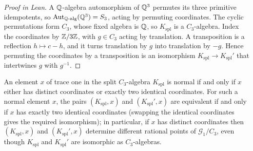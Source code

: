 \begin{proof}[Proof in Lean]

\leanok

A $\mathbb{Q}$-algebra automorphism of $\mathbb{Q}^3$ permutes its three primitive idempotents, so $\mathrm{Aut}_{\mathbb{Q}\text{-alg}}(\mathbb{Q}^3)=S_3$, acting by permuting coordinates. The cyclic permutations form $C_3$, whose fixed algebra is $\mathbb{Q}$, so $K_{\text{spl}}$ is a $C_3$-algebra. Index the coordinates by $\mathbb{Z}/3\mathbb{Z}$, with $g\in C_3$ acting by translation. A transposition is a reflection $h\mapsto c-h$, and it turns translation by $g$ into translation by $-g$. Hence permuting the coordinates by a transposition is an isomorphism $K_{\text{spl}}\to K_{\text{spl}}'$ that intertwines $g$ with $g^{-1}$.

\end{proof}

\begin{example}

\label{example:splitAlgebraNormalElement}


\leanok



 An element $x$ of trace one in the split $C_3$-algebra $K_{\text{spl}}$ is normal if and only if $x$ either has distinct coordinates or exactly two identical coordinates. For such a normal element $x$, the pairs $(K_{\text{spl}},x)$ and $(K_{\text{spl}}',x)$ are equivalent if and only if $x$ has exactly two identical coordinates (swapping the identical coordinates gives the required isomorphism); in particular, if $x$ has distinct coordinates then $(K_{\text{spl}},x)$ and $(K_{\text{spl}}',x)$ determine different rational points of $\mathcal G_1/C_3$, even though $K_{\text{spl}}$ and $K_{\text{spl}}'$ are isomorphic as $C_3$-algebras. 

\end{example}

